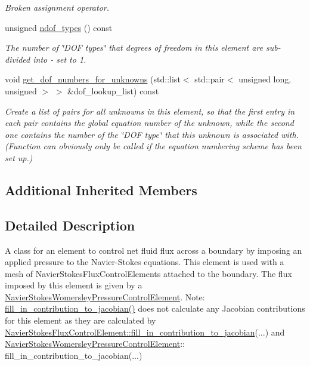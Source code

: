 \begin{DoxyCompactItemize}
\begin{DoxyCompactList}\small\item\em Broken assignment operator. \end{DoxyCompactList}\item 
unsigned \hyperlink{classoomph_1_1NetFluxControlElementForWomersleyPressureControl_a538b22e5aceecf140d03e400a8848a33}{ndof\+\_\+types} () const
\begin{DoxyCompactList}\small\item\em The number of \char`\"{}\+D\+O\+F types\char`\"{} that degrees of freedom in this element are sub-\/divided into -\/ set to 1. \end{DoxyCompactList}\item 
void \hyperlink{classoomph_1_1NetFluxControlElementForWomersleyPressureControl_a63f6761cad384044fae2c8339422c9df}{get\+\_\+dof\+\_\+numbers\+\_\+for\+\_\+unknowns} (std\+::list$<$ std\+::pair$<$ unsigned long, unsigned $>$ $>$ \&dof\+\_\+lookup\+\_\+list) const
\begin{DoxyCompactList}\small\item\em Create a list of pairs for all unknowns in this element, so that the first entry in each pair contains the global equation number of the unknown, while the second one contains the number of the \char`\"{}\+D\+O\+F type\char`\"{} that this unknown is associated with. (Function can obviously only be called if the equation numbering scheme has been set up.) \end{DoxyCompactList}\end{DoxyCompactItemize}
\subsection*{Additional Inherited Members}


\subsection{Detailed Description}
A class for an element to control net fluid flux across a boundary by imposing an applied pressure to the Navier-\/\+Stokes equations. This element is used with a mesh of Navier\+Stokes\+Flux\+Control\+Elements attached to the boundary. The flux imposed by this element is given by a \hyperlink{classoomph_1_1NavierStokesWomersleyPressureControlElement}{Navier\+Stokes\+Womersley\+Pressure\+Control\+Element}. Note\+: \hyperlink{classoomph_1_1NetFluxControlElement_a7b7d3a32fcad5b06fe6a49f05f2c01a9}{fill\+\_\+in\+\_\+contribution\+\_\+to\+\_\+jacobian()} does not calculate any Jacobian contributions for this element as they are calculated by \hyperlink{classoomph_1_1NavierStokesFluxControlElement_a6a745b0b8b1417b7f61782e959c31f69}{Navier\+Stokes\+Flux\+Control\+Element\+::fill\+\_\+in\+\_\+contribution\+\_\+to\+\_\+jacobian}(...) and \hyperlink{classoomph_1_1NavierStokesWomersleyPressureControlElement}{Navier\+Stokes\+Womersley\+Pressure\+Control\+Element}\+:\+: fill\+\_\+in\+\_\+contribution\+\_\+to\+\_\+jacobian(...) 

